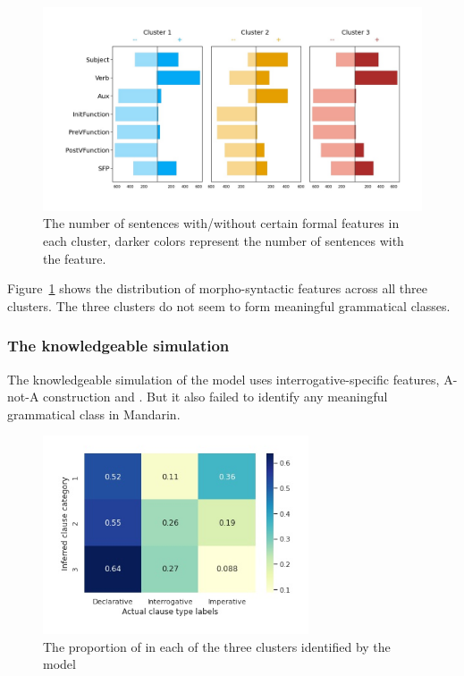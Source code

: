 \begin{figure}[H]
    \centering
    \includegraphics[width=1\textwidth]{figures/man-baseline-conservative-syncluster.jpg}
    \caption{The number of sentences with/without certain formal features in each cluster, darker colors represent the number of sentences with the feature. }
    \label{fig:man-baseline-conservative-syncluster}
\end{figure}

Figure~\ref{fig:man-baseline-conservative-syncluster} shows the distribution of morpho-syntactic features across all three clusters. The three clusters do not seem to form meaningful grammatical classes.

\subsubsection{The knowledgeable simulation}
The knowledgeable simulation of the \dlearnerabbr{} model uses interrogative-specific features, \textpm A-not-A construction and \textpm {}. But it also failed to identify any meaningful grammatical class in Mandarin.

\begin{figure}[H]
    \centering
    \includegraphics[width=0.7\textwidth]{figures/man-baseline-mid-heat.jpg}
    \caption{The proportion of \diis{} in each of the three clusters identified by the \dlearnerabbr{} model}
    \label{fig:man-baseline-mid-heat}
\end{figure}



